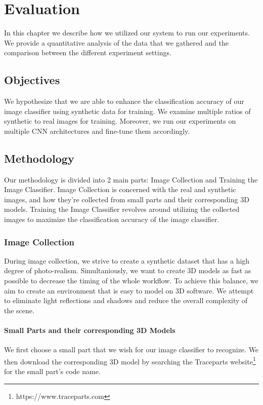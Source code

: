 \chapter{Evaluation}

In this chapter we describe how we utilized our system to run our experiments. We provide a quantitative analysis of the data that we gathered and the comparison between the different experiment settings.

\section{Objectives}

We hypothesize that we are able to enhance the classification accuracy of our image classifier using synthetic data for training. We examine multiple ratios of synthetic to real images for training. Moreover, we run our experiments on multiple CNN architectures and fine-tune them accordingly.


\section{Methodology}

Our methodology is divided into 2 main parts: Image Collection and Training the Image Classifier. Image Collection is concerned with the real and synthetic images, and how they're collected from small parts and their corresponding 3D models. Training the Image Classifier revolves around utilizing the collected images to maximize the classification accuracy of the image classifier.

\subsection{Image Collection}

During image collection, we strive to create a synthetic dataset that has a high degree of photo-realism. Simultaniously, we want to create 3D models as fast as possible to decrease the timing of the whole workflow. To achieve this balance, we aim to create an environment that is easy to model on 3D software. We attempt to eliminate light reflections and shadows and reduce the overall complexity of the scene.

\subsubsection{Small Parts and their corresponding 3D Models}
We first choose a small part that we wish for our image classifier to recognize. We then download the corresponding 3D model by searching the Traceparts website\footnote{https://www.traceparts.com} for the small part's code name.

